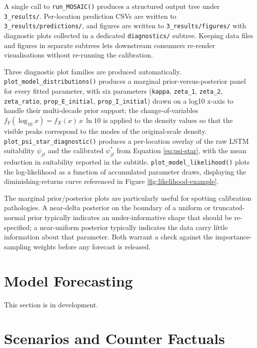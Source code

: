 \documentclass[
]{book}
\begin{document}
A single call to \texttt{run\_MOSAIC()} produces a structured output tree under \texttt{3\_results/}. Per-location prediction CSVs are written to \texttt{3\_results/predictions/}, and figures are written to \texttt{3\_results/figures/} with diagnostic plots collected in a dedicated \texttt{diagnostics/} subtree. Keeping data files and figures in separate subtrees lets downstream consumers re-render visualisations without re-running the calibration.

Three diagnostic plot families are produced automatically. \texttt{plot\_model\_distributions()} produces a marginal prior-versus-posterior panel for every fitted parameter, with six parameters (\texttt{kappa}, \texttt{zeta\_1}, \texttt{zeta\_2}, \texttt{zeta\_ratio}, \texttt{prop\_E\_initial}, \texttt{prop\_I\_initial}) drawn on a log10 x-axis to handle their multi-decade prior support; the change-of-variables \(f_Y(\log_{10} x) = f_X(x) \, x \, \ln 10\) is applied to the density values so that the visible peaks correspond to the modes of the original-scale density. \texttt{plot\_psi\_star\_diagnostic()} produces a per-location overlay of the raw LSTM suitability \(\psi_{jt}\) and the calibrated \(\psi^{\ast}_{jt}\) from Equation \eqref{eq:psi-star}, with the mean reduction in suitability reported in the subtitle. \texttt{plot\_model\_likelihood()} plots the log-likelihood as a function of accumulated parameter draws, displaying the diminishing-returns curve referenced in Figure \ref{fig:likelihood-example}.

The marginal prior/posterior plots are particularly useful for spotting calibration pathologies. A near-delta posterior on the boundary of a uniform or truncated-normal prior typically indicates an under-informative shape that should be re-specified; a near-uniform posterior typically indicates the data carry little information about that parameter. Both warrant a check against the importance-sampling weights before any forecast is released.

\section{Model Forecasting}\label{model-forecasting}

This section is in development.

\section{Scenarios and Counter Factuals}\label{scenarios-and-counter-factuals}
\end{document}

